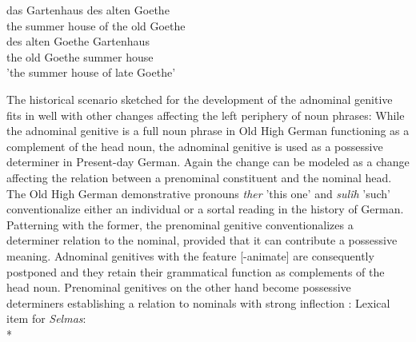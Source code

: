 \documentclass[output=paper]{langsci/langscibook}
\begin{document}
\eal
\ex
\gll das Gartenhaus des alten Goethe \\ the {summer house} {of the} old Goethe \\
\ex 
\gll *des alten Goethe Gartenhaus \\ the old Goethe {summer house} \\
\glt 'the summer house of late Goethe'
\zl

The historical scenario sketched for the development of the adnominal genitive fits in well with other changes affecting the left periphery of noun phrases: While the adnominal genitive is a full noun phrase in Old High German functioning as a complement of the head noun, the adnominal genitive is used as a possessive determiner in Present-day German. Again the change can be modeled as a change affecting the relation between a prenominal constituent and the nominal head. The Old High German demonstrative pronouns \textit{ther} 'this one' and \textit{sulîh} 'such' conventionalize either an individual or a sortal reading in the history of German. Patterning with the former, the prenominal genitive conventionalizes a determiner relation to the nominal, provided that it can contribute a possessive meaning. Adnominal genitives with the feature [-animate] are consequently postponed and they retain their grammatical function as complements of the head noun. Prenominal genitives on the other hand become possessive determiners   establishing a \spr relation to nominals with strong inflection \citep[54]{PoSa94}:
\ea
Lexical item for \emph{Selmas}:\\*
\z 
\end{document}
